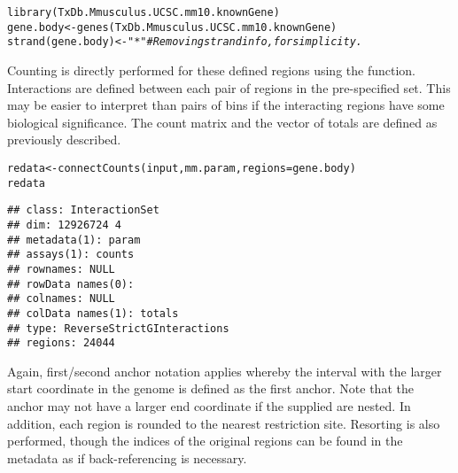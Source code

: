 \documentclass{report}\usepackage[]{graphicx}\usepackage[usenames,dvipsnames]{color}
\newcommand{\hlstr}[1]{\textcolor[rgb]{0.251,0.627,0.251}{#1}}%
\newcommand{\hlcom}[1]{\textcolor[rgb]{0.502,0.502,0.502}{\textit{#1}}}%
\newcommand{\hlstd}[1]{\textcolor[rgb]{0.251,0.251,0.251}{#1}}%
\newcommand{\hlkwb}[1]{\textcolor[rgb]{0,0,0}{#1}}%
\newcommand{\hlkwc}[1]{\textcolor[rgb]{0.251,0.251,0.251}{#1}}%
\newcommand{\hlkwd}[1]{\textcolor[rgb]{0.878,0.439,0.125}{#1}}%
\newenvironment{knitrout}{}{} %
\begin{document}
\begin{knitrout}
\color{fgcolor}\begin{kframe}
\begin{alltt}
\hlkwd{library}\hlstd{(TxDb.Mmusculus.UCSC.mm10.knownGene)}
\hlstd{gene.body} \hlkwb{<-} \hlkwd{genes}\hlstd{(TxDb.Mmusculus.UCSC.mm10.knownGene)}
\hlkwd{strand}\hlstd{(gene.body)} \hlkwb{<-} \hlstr{"*"} \hlcom{# Removing strand info, for simplicity.}
\end{alltt}
\end{kframe}
\end{knitrout}

Counting is directly performed for these defined regions using the  function.
Interactions are defined between each pair of regions in the pre-specified set.
This may be easier to interpret than pairs of bins if the interacting regions have some biological significance.
The count matrix and the vector of totals are defined as previously described.

\begin{knitrout}
\color{fgcolor}\begin{kframe}
\begin{alltt}
\hlstd{redata} \hlkwb{<-} \hlkwd{connectCounts}\hlstd{(input, mm.param,} \hlkwc{regions}\hlstd{=gene.body)}
\hlstd{redata}
\end{alltt}
\begin{verbatim}
## class: InteractionSet 
## dim: 12926724 4 
## metadata(1): param
## assays(1): counts
## rownames: NULL
## rowData names(0):
## colnames: NULL
## colData names(1): totals
## type: ReverseStrictGInteractions
## regions: 24044
\end{verbatim}
\end{kframe}
\end{knitrout}

Again, first/second anchor notation applies whereby the interval with the larger start coordinate in the genome is defined as the first anchor.
Note that the anchor may not have a larger end coordinate if the supplied  are nested.
In addition, each region is rounded to the nearest restriction site.
Resorting is also performed, though the indices of the original regions can be found in the metadata as  if back-referencing is necessary.
\end{document}
